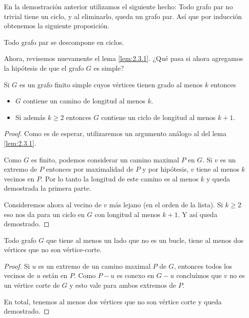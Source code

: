 \begin{nota}
    En la demostración anterior utilizamos el siguiente hecho: Todo grafo par no trivial tiene un ciclo, y al eliminarlo, queda un grafo par. Así que por inducción obtenemos la siguiente proposición.
\end{nota}

\begin{pro}
    Todo grafo par se descompone en ciclos.
\end{pro}

Ahora, revisemos nuevamente el lema \ref{lem:2.3.1}. ¿Qué pasa si ahora agregamos la hipótesis de que el grafo $G$ es simple?

\begin{lem}
    Si $G$ es un grafo finito simple cuyos vértices tienen grado al menos $k$ entonces
    
    \begin{itemize}
        \item $G$ contiene un camino de longitud al menos $k$.
        \item Si además $k \geq 2$ entonces $G$ contiene un ciclo de longitud al menos $k+1$.
    \end{itemize}
\end{lem}

\begin{proof}
    Como es de esperar, utilizaremos un argumento análogo al del lema \ref{lem:2.3.1}.
    
    Como $G$ es finito, podemos considerar un camino maximal $P$ en $G$. Si $v$ es un extremo de $P$ entonces por maximalidad de $P$ y por hipótesis, $v$ tiene al menos $k$ vecinos en $P$. Por lo tanto la longitud de este camino es al menos $k$ y queda demostrada la primera parte.
    
    Consideremos ahora al vecino de $v$ más lejano (en el orden de la lista). Si $k \geq 2$ eso nos da para un ciclo en $G$ con longitud al menos $k+1$. Y así queda demostrado.
\end{proof}

\begin{pro}
    Todo grafo $G$ que tiene al menos un lado que no es un bucle, tiene al menos dos vértices que no son vértice-corte.
\end{pro}

\begin{proof}
    Si $u$ es un extremo de un camino maximal $P$ de $G$, entonces todos los vecinos de $u$ están en $P$. Como $P - u$ es conexo en $G - u$ concluímos que $v$ no es un vértice corte de $G$ y esto vale para ambos extremos de $P$.
    
    En total, tenemos al menos dos vértices que no son vértice corte y queda demostrado.
\end{proof}

